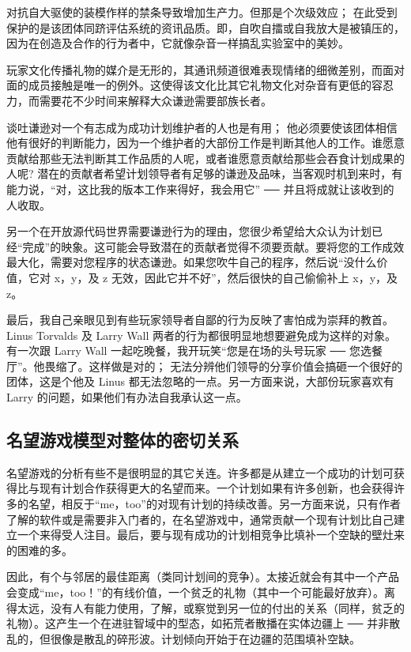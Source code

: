 对抗自大驱使的装模作样的禁条导致增加生产力。但那是个次级效应； 在此受到保护的是该团体同跻评估系统的资讯品质。即，自吹自擂或自我放大是被镇压的，因为在创造及合作的行为者中，它就像杂音一样搞乱实验室中的美妙。

玩家文化传播礼物的媒介是无形的，其通讯频道很难表现情绪的细微差别，而面对面的成员接触是唯一的例外。这使得该文化比其它礼物文化对杂音有更低的容忍力，而需要花不少时间来解释大众谦逊需要部族长者。

谈吐谦逊对一个有志成为成功计划维护者的人也是有用； 他必须要使该团体相信他有很好的判断能力，因为一个维护者的大部份工作是判断其他人的工作。谁愿意贡献给那些无法判断其工作品质的人呢，或者谁愿意贡献给那些会吞食计划成果的人呢? 潜在的贡献者希望计划领导者有足够的谦逊及品味，当客观时机到来时，有能力说，“对，这比我的版本工作来得好，我会用它”  ──  并且将成就让该收到的人收取。

另一个在开放源代码世界需要谦逊行为的理由，您很少希望给大众认为计划已经“完成”的映象。这可能会导致潜在的贡献者觉得不须要贡献。要将您的工作成效最大化，需要对您程序的状态谦逊。如果您吹牛自己的程序，然后说“没什么价值，它对 x，y，及 z 无效，因此它并不好”，然后很快的自己偷偷补上 x，y，及 z。

最后，我自己亲眼见到有些玩家领导者自鄙的行为反映了害怕成为崇拜的教首。Linus Torvalds 及 Larry Wall 两者的行为都很明显地想要避免成为这样的对象。有一次跟 Larry Wall 一起吃晚餐，我开玩笑“您是在场的头号玩家  ──  您选餐厅”。他畏缩了。这样做是对的； 无法分辨他们领导的分享价值会搞砸一个很好的团体，这是个他及 Linus 都无法忽略的一点。另一方面来说，大部份玩家喜欢有 Larry 的问题，如果他们有办法自我承认这一点。


\subsection{名望游戏模型对整体的密切关系}
名望游戏的分析有些不是很明显的其它关连。许多都是从建立一个成功的计划可获得比与现有计划合作获得更大的名望而来。一个计划如果有许多创新，也会获得许多的名望，相反于“me，too”的对现有计划的持续改善。另一方面来说，只有作者了解的软件或是需要非入门者的，在名望游戏中，通常贡献一个现有计划比自己建立一个来得受人注目。最后，要与现有成功的计划相竞争比填补一个空缺的壁灶来的困难的多。

因此，有个与邻居的最佳距离（类同计划间的竞争）。太接近就会有其中一个产品会变成“me，too！”的有线价值，一个贫乏的礼物（其中一个可能最好放弃）。离得太远，没有人有能力使用，了解，或察觉到另一位的付出的关系（同样，贫乏的礼物）。这产生一个在进驻智域中的型态，如拓荒者散播在实体边疆上  ──  并非散乱的，但很像是散乱的碎形波。计划倾向开始于在边疆的范围填补空缺。

